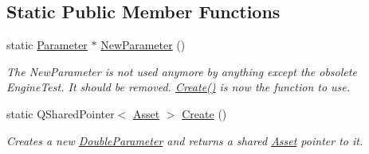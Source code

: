 \subsection*{Static Public Member Functions}
\begin{DoxyCompactItemize}
\item 
\hypertarget{class_picto_1_1_double_parameter_ad98013ee04a3aabcfbc35844fd7a8994}{static \hyperlink{class_picto_1_1_parameter}{Parameter} $\ast$ \hyperlink{class_picto_1_1_double_parameter_ad98013ee04a3aabcfbc35844fd7a8994}{New\-Parameter} ()}\label{class_picto_1_1_double_parameter_ad98013ee04a3aabcfbc35844fd7a8994}

\begin{DoxyCompactList}\small\item\em The New\-Parameter is not used anymore by anything except the obsolete Engine\-Test. It should be removed. \hyperlink{class_picto_1_1_double_parameter_a5f16551d37fb0a7aa83a8896e73bf8ee}{Create()} is now the function to use. \end{DoxyCompactList}\item 
\hypertarget{class_picto_1_1_double_parameter_a5f16551d37fb0a7aa83a8896e73bf8ee}{static Q\-Shared\-Pointer$<$ \hyperlink{class_picto_1_1_asset}{Asset} $>$ \hyperlink{class_picto_1_1_double_parameter_a5f16551d37fb0a7aa83a8896e73bf8ee}{Create} ()}\label{class_picto_1_1_double_parameter_a5f16551d37fb0a7aa83a8896e73bf8ee}

\begin{DoxyCompactList}\small\item\em Creates a new \hyperlink{class_picto_1_1_double_parameter}{Double\-Parameter} and returns a shared \hyperlink{class_picto_1_1_asset}{Asset} pointer to it. \end{DoxyCompactList}\end{DoxyCompactItemize}
